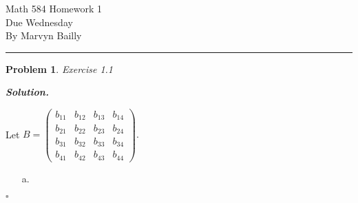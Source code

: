 \documentclass[12pt]{report}
\newtheorem{problem}{Problem}
\newenvironment{solution}[1][\it{Solution}]{\textbf{#1. } }{$\square$}
\begin{document}
\large

\begin{center}
 Math 584 Homework 1\\
 Due Wednesday\\
 By Marvyn Bailly\\
\end{center}

\normalsize

\hrule



\begin{problem}
    Exercise 1.1
\end{problem}

\begin{solution}

    \noindent
    Let $B = \begin{pmatrix}b_{11}&b_{12}&b_{13}&b_{14}\\ b_{21}&b_{22}&b_{23}&b_{24}\\ b_{31}&b_{32}&b_{33}&b_{34}\\ b_{41}&b_{42}&b_{43}&b_{44}\end{pmatrix}.$
    \begin{enumerate}
        \item [a.]  
        

\end{enumerate}
\end{solution}
\end{document}
